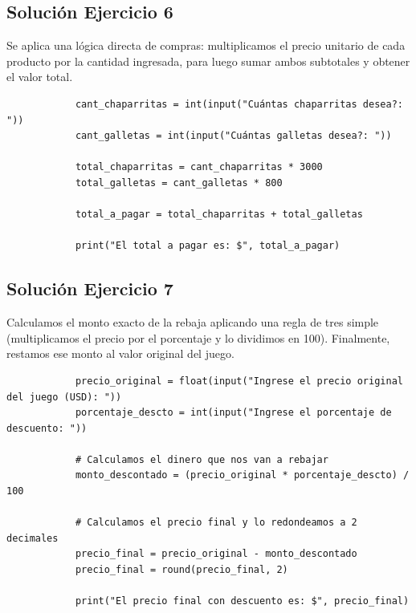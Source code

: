 \documentclass[11pt, a4paper]{article}
\begin{document}
	\subsection*{Solución Ejercicio 6}
	\begin{solucion}
		Se aplica una lógica directa de compras: multiplicamos el precio unitario de cada producto por la cantidad ingresada, para luego sumar ambos subtotales y obtener el valor total.
		
		\begin{lstlisting}
			cant_chaparritas = int(input("Cuántas chaparritas desea?: "))
			cant_galletas = int(input("Cuántas galletas desea?: "))
			
			total_chaparritas = cant_chaparritas * 3000
			total_galletas = cant_galletas * 800
			
			total_a_pagar = total_chaparritas + total_galletas
			
			print("El total a pagar es: $", total_a_pagar)
		\end{lstlisting}
	\end{solucion}
	
	\subsection*{Solución Ejercicio 7}
	\begin{solucion}
		Calculamos el monto exacto de la rebaja aplicando una regla de tres simple (multiplicamos el precio por el porcentaje y lo dividimos en 100). Finalmente, restamos ese monto al valor original del juego.
		
		\begin{lstlisting}
			precio_original = float(input("Ingrese el precio original del juego (USD): "))
			porcentaje_descto = int(input("Ingrese el porcentaje de descuento: "))
			
			# Calculamos el dinero que nos van a rebajar
			monto_descontado = (precio_original * porcentaje_descto) / 100
			
			# Calculamos el precio final y lo redondeamos a 2 decimales
			precio_final = precio_original - monto_descontado
			precio_final = round(precio_final, 2)
			
			print("El precio final con descuento es: $", precio_final)
		\end{lstlisting}
	\end{solucion}
	
\end{document}
